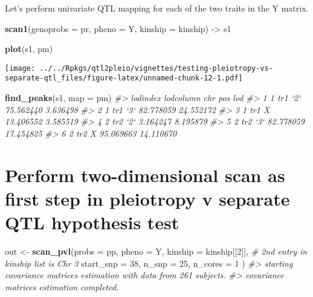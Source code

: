 \documentclass[oneside]{book}
\newenvironment{Shaded}{\begin{snugshade}}{\end{snugshade}}
\newcommand{\CommentTok}[1]{\textcolor[rgb]{0.56,0.35,0.01}{\textit{#1}}}
\newcommand{\DataTypeTok}[1]{\textcolor[rgb]{0.13,0.29,0.53}{#1}}
\newcommand{\DecValTok}[1]{\textcolor[rgb]{0.00,0.00,0.81}{#1}}
\newcommand{\KeywordTok}[1]{\textcolor[rgb]{0.13,0.29,0.53}{\textbf{#1}}}
\newcommand{\NormalTok}[1]{#1}
\newcommand{\StringTok}[1]{\textcolor[rgb]{0.31,0.60,0.02}{#1}}
\begin{document}
Let's perform univariate QTL mapping for each of the two traits in the Y
matrix.

\begin{Shaded}
\begin{Highlighting}[]
\KeywordTok{scan1}\NormalTok{(}\DataTypeTok{genoprobs =}\NormalTok{ pr, }\DataTypeTok{pheno =}\NormalTok{ Y, }\DataTypeTok{kinship =}\NormalTok{ kinship) ->}\StringTok{ }\NormalTok{s1}
\end{Highlighting}
\end{Shaded}

\begin{Shaded}
\begin{Highlighting}[]
\KeywordTok{plot}\NormalTok{(s1, pm)}
\end{Highlighting}
\end{Shaded}

\texttt{[image: ../../Rpkgs/qtl2pleio/vignettes/testing-pleiotropy-vs-separate-qtl\_files/figure-latex/unnamed-chunk-12-1.pdf]}

\begin{Shaded}
\begin{Highlighting}[]
\KeywordTok{find_peaks}\NormalTok{(s1, }\DataTypeTok{map =}\NormalTok{ pm)}
\CommentTok{#>   lodindex lodcolumn chr       pos       lod}
\CommentTok{#> 1        1       tr1 `2` 75.562440  3.636498}
\CommentTok{#> 2        1       tr1 `3` 82.778059 24.552172}
\CommentTok{#> 3        1       tr1   X 13.406552  3.585519}
\CommentTok{#> 4        2       tr2 `2`  3.164247  8.195879}
\CommentTok{#> 5        2       tr2 `3` 82.778059 17.454825}
\CommentTok{#> 6        2       tr2   X 95.069663 14.110670}
\end{Highlighting}
\end{Shaded}

\hypertarget{perform-two-dimensional-scan-as-first-step-in-pleiotropy-v-separate-qtl-hypothesis-test}{%
\section{Perform two-dimensional scan as first step in pleiotropy v
separate QTL hypothesis
test}\label{perform-two-dimensional-scan-as-first-step-in-pleiotropy-v-separate-qtl-hypothesis-test}}

\begin{Shaded}
\begin{Highlighting}[]
\NormalTok{out <-}\StringTok{ }\KeywordTok{scan_pvl}\NormalTok{(}\DataTypeTok{probs =}\NormalTok{ pp, }
                \DataTypeTok{pheno =}\NormalTok{ Y, }
                \DataTypeTok{kinship =}\NormalTok{ kinship[[}\DecValTok{2}\NormalTok{]], }\CommentTok{# 2nd entry in kinship list is Chr 3}
                \DataTypeTok{start_snp =} \DecValTok{38}\NormalTok{, }
                \DataTypeTok{n_snp =} \DecValTok{25}\NormalTok{, }\DataTypeTok{n_cores =} \DecValTok{1}
\NormalTok{                )}
\CommentTok{#> starting covariance matrices estimation with data from 261 subjects.}
\CommentTok{#> covariance matrices estimation completed.}
\end{Highlighting}
\end{Shaded}
\end{document}
